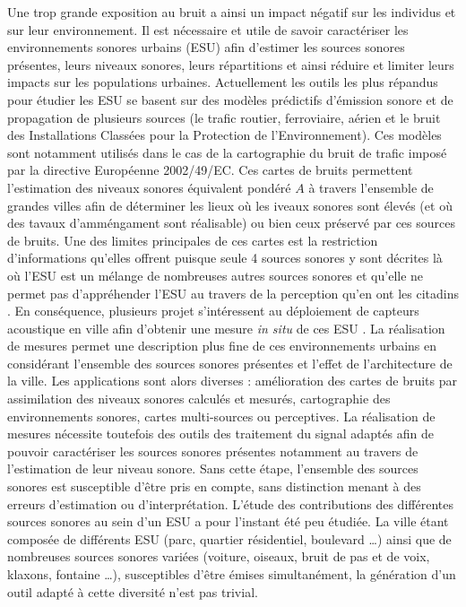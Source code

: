 Une trop grande exposition au bruit a ainsi un impact négatif sur les individus et sur leur environnement. Il est nécessaire et utile de savoir caractériser les environnements sonores urbains (ESU) afin d'estimer les sources sonores présentes, leurs niveaux sonores, leurs répartitions et ainsi réduire et limiter leurs impacts sur les populations urbaines.
Actuellement les outils les plus répandus pour étudier les ESU se basent sur des modèles prédictifs d'émission sonore et de propagation de plusieurs sources (le trafic routier, ferroviaire, aérien et le bruit des Installations Classées pour la Protection de l'Environnement). Ces modèles sont notamment utilisés dans le cas de la cartographie du bruit de trafic imposé par la directive Européenne 2002/49/EC. Ces cartes de bruits permettent l'estimation des niveaux sonores équivalent pondéré $A$ à travers l'ensemble de grandes villes afin de déterminer les lieux où les iveaux sonores sont élevés (et où des tavaux d'amméngament sont réalisable) ou bien ceux préservé par ces sources de bruits. Une des limites principales de ces cartes est la restriction d'informations qu'elles offrent puisque seule 4 sources sonores y sont décrites là où l'ESU est un mélange de nombreuses autres sources sonores et qu'elle ne permet pas d'appréhender l'ESU au travers de la perception qu'en ont les citadins \cite{perception}. 
En conséquence, plusieurs projet s'intéressent au déploiement de capteurs acoustique en ville afin d'obtenir une mesure \textit{in situ} de ces ESU \cite{picaut2017characterization,zambon2017life}. La réalisation de mesures permet une description plus fine de ces environnements urbains en considérant l'ensemble des sources sonores présentes et l'effet de l'architecture de la ville. Les applications sont alors diverses : amélioration des cartes de bruits par assimilation des niveaux sonores calculés et mesurés, cartographie des environnements sonores, cartes multi-sources ou perceptives.
La réalisation de mesures nécessite toutefois des outils des traitement du signal adaptés afin de pouvoir caractériser les sources sonores présentes notamment au travers de l'estimation de leur niveau sonore. Sans cette étape, l'ensemble des sources sonores est susceptible d'être pris en compte, sans distinction menant à des erreurs d'estimation ou d'interprétation. L'étude des contributions des différentes sources sonores au sein d'un ESU a pour l'instant été peu étudiée. 
La ville étant composée de différents ESU (parc, quartier résidentiel, boulevard \dots{}) ainsi que de nombreuses sources sonores variées (voiture, oiseaux, bruit de pas et de voix, klaxons, fontaine \dots{}), susceptibles d'être émises simultanément, la génération d'un outil adapté à cette diversité n'est pas trivial.

